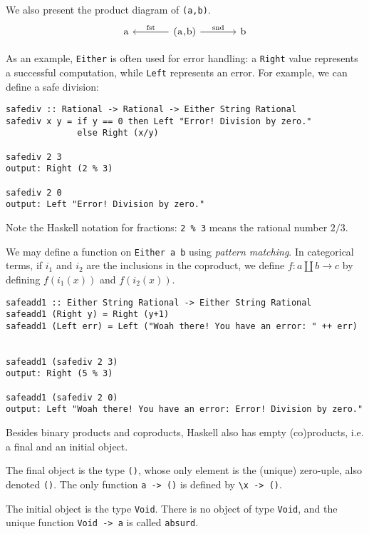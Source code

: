 \documentclass[11	pt]{article}
\theoremstyle{nonumberplain}
\newcommand*\lsin{\lstinline}
\newcommand*\lsmath[1]{\text{\lstinline|#1|}}
\begin{document}
We also present the product diagram of \lsin|(a,b)|.
\begin{equation}
\begin{tikzcd}[column sep=large]
\lsmath{a} & \lsmath{(a,b)} \arrow[l, "\lsmath{fst}"'] \arrow[r, "\lsmath{snd}"] & \lsmath{b} 
\end{tikzcd}
\end{equation}

As an example, \lsin|Either| is often used for error handling: a \lsin|Right| value represents a successful computation, while \lsin|Left| represents an error. For example, we can define a safe division:
\begin{lstlisting}
safediv :: Rational -> Rational -> Either String Rational
safediv x y = if y == 0 then Left "Error! Division by zero."
              else Right (x/y)
              
safediv 2 3
output: Right (2 % 3)

safediv 2 0
output: Left "Error! Division by zero."
\end{lstlisting}

Note the Haskell notation for fractions: \lsin|2 %

We may define a function on \lsin|Either a b| using \emph{pattern matching}. In categorical terms, if $i_1$ and $i_2$ are the inclusions in the coproduct, we define $f \colon a \amalg b \to c$ by defining $f(i_1(x))$ and $f(i_2(x))$.

\begin{lstlisting}
safeadd1 :: Either String Rational -> Either String Rational
safeadd1 (Right y) = Right (y+1)
safeadd1 (Left err) = Left ("Woah there! You have an error: " ++ err)


safeadd1 (safediv 2 3)
output: Right (5 % 3)

safeadd1 (safediv 2 0)
output: Left "Woah there! You have an error: Error! Division by zero."
\end{lstlisting}

Besides binary products and coproducts, Haskell also has empty (co)products, i.e. a final and an initial object.

The final object is the type \lsin|()|, whose only element is the (unique) zero-uple, also denoted \lsin|()|. The only function \lsin|a -> ()| is defined by \lsin|\x -> ()|.

The initial object is the type \lsin|Void|. There is no object of type \lsin|Void|, and the unique function \lsin|Void -> a| is called \lsin|absurd|.
\end{document}
